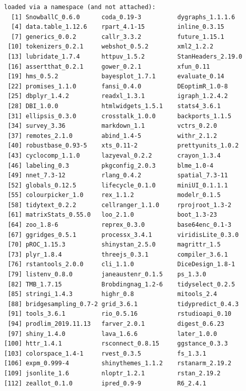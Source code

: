 \documentclass{article}\usepackage[]{graphicx}\usepackage[]{color}
\makeatletter
\newenvironment{kframe}{%
 \def\at@end@of@kframe{}%
 \ifinner\ifhmode%
  \def\at@end@of@kframe{\end{minipage}}%
  \begin{minipage}{\columnwidth}%
 \fi\fi%
 \def\FrameCommand##1{\hskip\@totalleftmargin \hskip-\fboxsep
 \colorbox{shadecolor}{##1}\hskip-\fboxsep
     \hskip-\linewidth \hskip-\@totalleftmargin \hskip\columnwidth}%
 \MakeFramed {\advance\hsize-\width
   \@totalleftmargin\z@ \linewidth\hsize
   \@setminipage}}%
 {\par\unskip\endMakeFramed%
 \at@end@of@kframe}
\newenvironment{knitrout}{}{} %
\makeatother
\begin{document}
\begin{knitrout}
\begin{kframe}
\begin{verbatim}
loaded via a namespace (and not attached):
  [1] SnowballC_0.6.0      coda_0.19-3          dygraphs_1.1.1.6    
  [4] data.table_1.12.6    rpart_4.1-15         inline_0.3.15       
  [7] generics_0.0.2       callr_3.3.2          future_1.15.1       
 [10] tokenizers_0.2.1     webshot_0.5.2        xml2_1.2.2          
 [13] lubridate_1.7.4      httpuv_1.5.2         StanHeaders_2.19.0  
 [16] assertthat_0.2.1     gower_0.2.1          xfun_0.11           
 [19] hms_0.5.2            bayesplot_1.7.1      evaluate_0.14       
 [22] promises_1.1.0       fansi_0.4.0          DEoptimR_1.0-8      
 [25] dbplyr_1.4.2         readxl_1.3.1         igraph_1.2.4.2      
 [28] DBI_1.0.0            htmlwidgets_1.5.1    stats4_3.6.1        
 [31] ellipsis_0.3.0       crosstalk_1.0.0      backports_1.1.5     
 [34] survey_3.36          markdown_1.1         vctrs_0.2.0         
 [37] remotes_2.1.0        abind_1.4-5          withr_2.1.2         
 [40] robustbase_0.93-5    xts_0.11-2           prettyunits_1.0.2   
 [43] cyclocomp_1.1.0      lazyeval_0.2.2       crayon_1.3.4        
 [46] labeling_0.3         pkgconfig_2.0.3      blme_1.0-4          
 [49] nnet_7.3-12          rlang_0.4.2          spatial_7.3-11      
 [52] globals_0.12.5       lifecycle_0.1.0      miniUI_0.1.1.1      
 [55] colourpicker_1.0     rex_1.1.2            modelr_0.1.5        
 [58] tidytext_0.2.2       cellranger_1.1.0     rprojroot_1.3-2     
 [61] matrixStats_0.55.0   loo_2.1.0            boot_1.3-23         
 [64] zoo_1.8-6            reprex_0.3.0         base64enc_0.1-3     
 [67] ggridges_0.5.1       processx_3.4.1       viridisLite_0.3.0   
 [70] pROC_1.15.3          shinystan_2.5.0      magrittr_1.5        
 [73] plyr_1.8.4           threejs_0.3.1        compiler_3.6.1      
 [76] rstantools_2.0.0     cli_1.1.0            DiceDesign_1.8-1    
 [79] listenv_0.8.0        janeaustenr_0.1.5    ps_1.3.0            
 [82] TMB_1.7.15           Brobdingnag_1.2-6    tidyselect_0.2.5    
 [85] stringi_1.4.3        highr_0.8            mitools_2.4         
 [88] bridgesampling_0.7-2 grid_3.6.1           tidypredict_0.4.3   
 [91] tools_3.6.1          rio_0.5.16           rstudioapi_0.10     
 [94] prodlim_2019.11.13   farver_2.0.1         digest_0.6.23       
 [97] shiny_1.4.0          lava_1.6.6           later_1.0.0         
[100] httr_1.4.1           rsconnect_0.8.15     ggstance_0.3.3      
[103] colorspace_1.4-1     rvest_0.3.5          fs_1.3.1            
[106] expm_0.999-4         shinythemes_1.1.2    rstanarm_2.19.2     
[109] jsonlite_1.6         nloptr_1.2.1         rstan_2.19.2        
[112] zeallot_0.1.0        ipred_0.9-9          R6_2.4.1            

\end{verbatim}
\end{kframe}
\end{knitrout}
\end{document}
